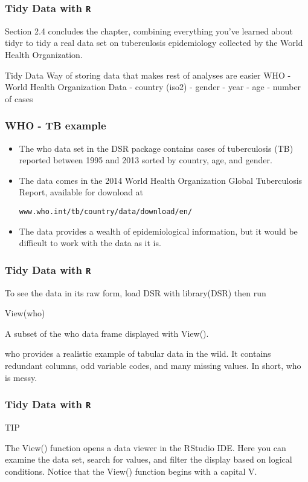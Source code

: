 \documentclass[TIDYMASTER.tex]{subfiles}
\begin{document}
 
\begin{frame}
	\frametitle{Tidy Data with \texttt{R}}
	\Large
	Section 2.4 concludes the chapter, combining everything you’ve learned about tidyr to tidy a real data set on tuberculosis epidemiology collected by the World Health Organization.
\end{frame}
\begin{frame}
	

Tidy Data
Way of storing data that makes rest of analyses are easier
WHO - World Health Organization Data
- country (iso2)
- gender
- year
- age
- number of cases 

	
\end{frame}
\begin{frame}[fragile]
\frametitle{WHO - TB example}
\begin{itemize}
\item The who data set in the DSR package contains cases of tuberculosis (TB) reported between 1995 and 2013 sorted by country, age, and gender. 
\item The data comes in the 2014 World Health Organization Global Tuberculosis Report, available for download at \begin{verbatim}
www.who.int/tb/country/data/download/en/
\end{verbatim} 
\item The data provides a wealth of epidemiological information, but it would be difficult to work with the data as it is.
\end{itemize}	


\end{frame}
\begin{frame}[fragile]
\frametitle{Tidy Data with \texttt{R}}
\Large
To see the data in its raw form, load DSR with library(DSR) then run

View(who)

A subset of the who data frame displayed with View().

who provides a realistic example of tabular data in the wild. It contains redundant columns, odd variable codes, and many missing values. In short, who is messy.
\end{frame}
\begin{frame}[fragile]
	\frametitle{Tidy Data with \texttt{R}}
	\Large
TIP

The View() function opens a data viewer in the RStudio IDE. Here you can examine the data set, search for values, and filter the display based on logical conditions. Notice that the View() function begins with a capital V.
\end{frame}
\end{document}
